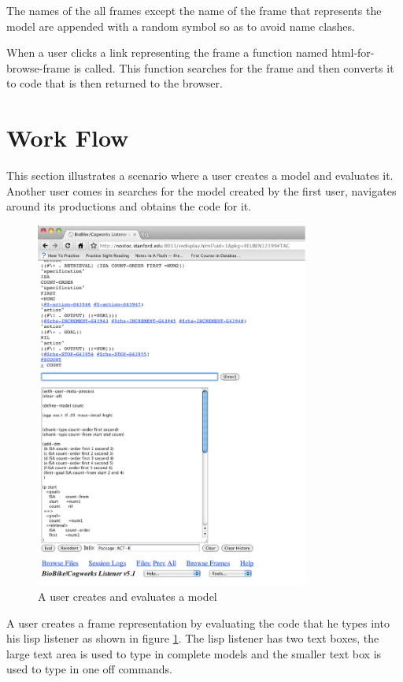 The names of the all frames except the name of the frame that represents
the model are appended with a random symbol so as to avoid name
clashes. 


When a user clicks a link representing the frame a function named
html-for-browse-frame is called. This function searches for the frame
and then converts it to code that is then returned to the browser.


\section{Work Flow}

This section illustrates a scenario where a user creates a model and
evaluates it. Another user comes in searches for the model created by
the first user, navigates around its productions and obtains the code for
it. 

\begin{figure}[htp]
  \centering
  \includegraphics[width=90mm]{UserCreatesModel}
  \caption{A user creates and evaluates a model}
  \label{UserCreatesModel}
\end{figure}

A user creates a frame representation by evaluating the code that he
types into his lisp listener as shown in figure
\ref{UserCreatesModel}. The lisp listener has two text boxes, the
large text area is used to type in complete models and the smaller
text box is used to type in one off commands.

